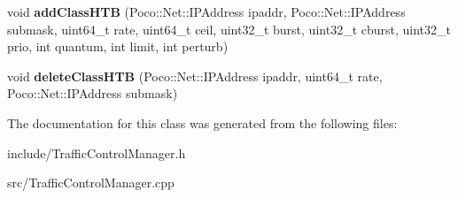 \begin{DoxyCompactItemize}
\item 
\mbox{\label{classecodtn_1_1net_1_1TrafficControlManager_a84f5f3e62ed693a1207cf102351ff4e3}} 
void {\bfseries add\+Class\+H\+TB} (Poco\+::\+Net\+::\+I\+P\+Address ipaddr, Poco\+::\+Net\+::\+I\+P\+Address submask, uint64\+\_\+t rate, uint64\+\_\+t ceil, uint32\+\_\+t burst, uint32\+\_\+t cburst, uint32\+\_\+t prio, int quantum, int limit, int perturb)
\item 
\mbox{\label{classecodtn_1_1net_1_1TrafficControlManager_a1c2cb3cddd5824390bbf08d448cb47d8}} 
void {\bfseries delete\+Class\+H\+TB} (Poco\+::\+Net\+::\+I\+P\+Address ipaddr, uint64\+\_\+t rate, Poco\+::\+Net\+::\+I\+P\+Address submask)
\end{DoxyCompactItemize}


The documentation for this class was generated from the following files\+:\begin{DoxyCompactItemize}
\item 
include/Traffic\+Control\+Manager.\+h\item 
src/Traffic\+Control\+Manager.\+cpp\end{DoxyCompactItemize}
